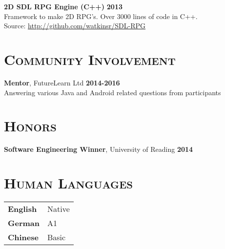 \documentclass[line, margin, 10pt]{res}
\begin{document}
\begin{resume}
{\bf 2D SDL RPG Engine (C++)} {\bf \hfill 2013}\\
Framework to make 2D RPG's. Over 3000 lines of code in C++.  \\
Source: \url{http://github.com/watkinsr/SDL-RPG}

\section{\textsc{Community Involvement}}

{\bf Mentor}, FutureLearn Ltd {\bf \hfill 2014-2016}\\
Answering various Java and Android related questions from participants

\section{\textsc{Honors}}

{\bf Software Engineering Winner}, University of Reading {\bf \hfill 2014}\\

\section{\textsc{Human Languages}}

\begin{tabular}[t]{@{} p{1.2in} p{3.75in} @{}}

\textbf{English} & Native\\ 
\textbf{German} & A1 \\
\textbf{Chinese} & Basic

\end{tabular}

\end{resume}
\end{document}
